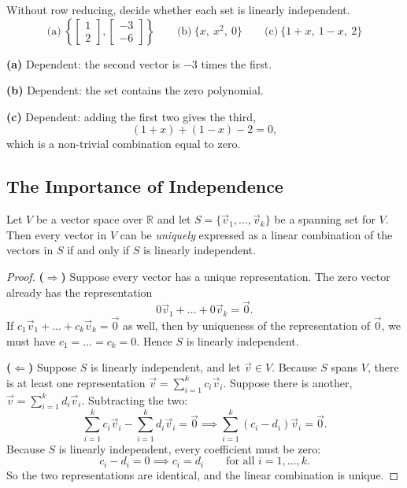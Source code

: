 \begin{example}
Without row reducing, decide whether each set is linearly independent.
\[
\text{(a)} \ \left\{ \begin{bmatrix} 1 \\ 2 \end{bmatrix}, \begin{bmatrix} -3 \\ -6 \end{bmatrix} \right\}
\qquad
\text{(b)} \ \{x, \ x^2, \ 0\}
\qquad
\text{(c)} \ \{1 + x, \ 1 - x, \ 2\}
\]

\begin{solution}
\textbf{(a)} Dependent: the second vector is $-3$ times the first.

\textbf{(b)} Dependent: the set contains the zero polynomial.

\textbf{(c)} Dependent: adding the first two gives the third,
\[
(1 + x) + (1 - x) - 2 = 0,
\]
which is a non-trivial combination equal to zero.
\end{solution}
\end{example}

\subsection{The Importance of Independence}

\begin{theorem}
Let $V$ be a vector space over $\mathbb{R}$ and let $S = \{\vec{v}_1, \dots, \vec{v}_k\}$ be a spanning set for $V$. Then every vector in $V$ can be \emph{uniquely} expressed as a linear combination of the vectors in $S$ if and only if $S$ is linearly independent.
\end{theorem}

\begin{proof}
\textbf{($\Longrightarrow$)} Suppose every vector has a unique representation. The zero vector already has the representation
\[
0\vec{v}_1 + \dots + 0\vec{v}_k = \vec{0}.
\]
If $c_1\vec{v}_1 + \dots + c_k\vec{v}_k = \vec{0}$ as well, then by uniqueness of the representation of $\vec{0}$, we must have $c_1 = \dots = c_k = 0$. Hence $S$ is linearly independent.

\textbf{($\Longleftarrow$)} Suppose $S$ is linearly independent, and let $\vec{v} \in V$. Because $S$ spans $V$, there is at least one representation $\vec{v} = \sum_{i=1}^k c_i\vec{v}_i$. Suppose there is another, $\vec{v} = \sum_{i=1}^k d_i\vec{v}_i$. Subtracting the two:
\[
\sum_{i=1}^k c_i\vec{v}_i - \sum_{i=1}^k d_i\vec{v}_i = \vec{0}
\implies
\sum_{i=1}^k (c_i - d_i)\vec{v}_i = \vec{0}.
\]
Because $S$ is linearly independent, every coefficient must be zero:
\[
c_i - d_i = 0 \implies c_i = d_i \qquad \text{for all } i = 1, \dots, k.
\]
So the two representations are identical, and the linear combination is unique.
\end{proof}


